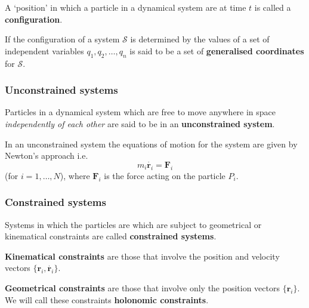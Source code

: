 \documentclass[12pt, a4paper]{article}
\begin{document}
\begin{definition}
    A `position' in which a particle in a dynamical system are at time \(t\) is called a \textbf{configuration}.
\end{definition}

\begin{definition}
    If the configuration of a system \(\mathcal S\) is determined by the values of a set of independent variables \(q_1,q_2,\ldots, q_n\) is said to be a set of \textbf{generalised coordinates} for \(\mathcal S\).
\end{definition}

\subsubsection{Unconstrained systems}

\begin{definition}
    Particles in a dynamical system which are free to move anywhere in space \textit{independently of each other} are said to be in an \textbf{unconstrained system}.
\end{definition}

\begin{theorem}
    In an unconstrained system the equations of motion for the system are given by Newton's approach i.e.
    \[m_i \dot{\bm{r}_i} = \bm{F}_i\]
    (for \(i=1,\ldots, N\)), where \(\bm{F}_i\) is the force acting on the particle \(P_i\).
\end{theorem}

\subsubsection{Constrained systems}

\begin{definition}
    Systems in which the particles are which are subject to geometrical or kinematical constraints are called \textbf{constrained systems}.
\end{definition}

\begin{definition}
    \textbf{Kinematical constraints} are those that involve the position and velocity vectors \(\{\bm{r}_i, \dot{\bm{r}_i} \}\).
\end{definition}

\begin{definition}
    \textbf{Geometrical constraints} are those that involve only the position vectors \(\{\bm{r}_i\}\). We will call these constraints \textbf{holonomic constraints}.
\end{definition}
\end{document}
